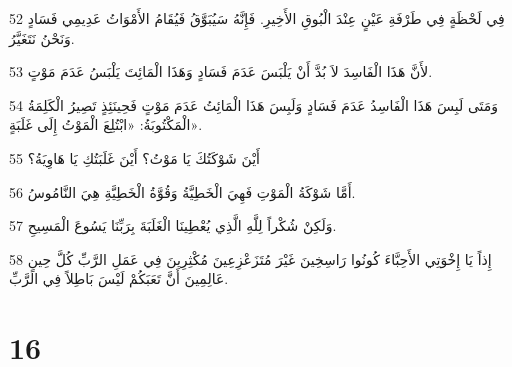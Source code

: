 \par 52 فِي لَحْظَةٍ فِي طَرْفَةِ عَيْنٍ عِنْدَ الْبُوقِ الأَخِيرِ. فَإِنَّهُ سَيُبَوَّقُ فَيُقَامُ الأَمْوَاتُ عَدِيمِي فَسَادٍ وَنَحْنُ نَتَغَيَّرُ.
\par 53 لأَنَّ هَذَا الْفَاسِدَ لاَ بُدَّ أَنْ يَلْبَسَ عَدَمَ فَسَادٍ وَهَذَا الْمَائِتَ يَلْبَسُ عَدَمَ مَوْتٍ.
\par 54 وَمَتَى لَبِسَ هَذَا الْفَاسِدُ عَدَمَ فَسَادٍ وَلَبِسَ هَذَا الْمَائِتُ عَدَمَ مَوْتٍ فَحِينَئِذٍ تَصِيرُ الْكَلِمَةُ الْمَكْتُوبَةُ: «ابْتُلِعَ الْمَوْتُ إِلَى غَلَبَةٍ».
\par 55 أَيْنَ شَوْكَتُكَ يَا مَوْتُ؟ أَيْنَ غَلَبَتُكِ يَا هَاوِيَةُ؟
\par 56 أَمَّا شَوْكَةُ الْمَوْتِ فَهِيَ الْخَطِيَّةُ وَقُوَّةُ الْخَطِيَّةِ هِيَ النَّامُوسُ.
\par 57 وَلَكِنْ شُكْراً لِلَّهِ الَّذِي يُعْطِينَا الْغَلَبَةَ بِرَبِّنَا يَسُوعَ الْمَسِيحِ.
\par 58 إِذاً يَا إِخْوَتِي الأَحِبَّاءَ كُونُوا رَاسِخِينَ غَيْرَ مُتَزَعْزِعِينَ مُكْثِرِينَ فِي عَمَلِ الرَّبِّ كُلَّ حِينٍ عَالِمِينَ أَنَّ تَعَبَكُمْ لَيْسَ بَاطِلاً فِي الرَّبِّ.

\chapter{16}

